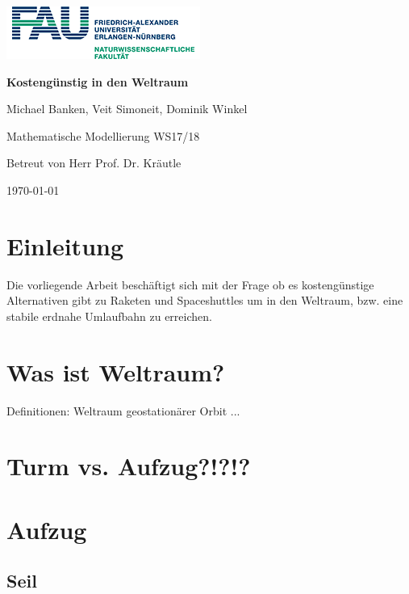 \documentclass[a4paper, 10pt]{report}
\begin{document}
\begin{titlepage}
\centering
\includegraphics[scale=1]{FAU-nat-logo.png}\par
\vspace{2cm}
{\huge\bfseries Kostengünstig in den Weltraum\par}
\vspace{1cm}
{\Large Michael Banken, Veit Simoneit, Dominik Winkel\par}
\vspace{2cm}
{\Large Mathematische Modellierung WS17/18\par}
\vspace{0.5cm}
{Betreut von Herr Prof. Dr. Kräutle\par}
\vfill
{\Large \today\par}

\end{titlepage}

\tableofcontents


\chapter{Einleitung}


Die vorliegende Arbeit beschäftigt sich mit der Frage ob es kostengünstige Alternativen gibt zu Raketen und Spaceshuttles um in den Weltraum, bzw. eine stabile erdnahe Umlaufbahn zu erreichen.\\
\chapter{Was ist Weltraum?}

Definitionen:
Weltraum
geostationärer Orbit
...

\chapter{Turm vs. Aufzug?!?!?}


\chapter{Aufzug}

\section{Seil}
\end{document}
